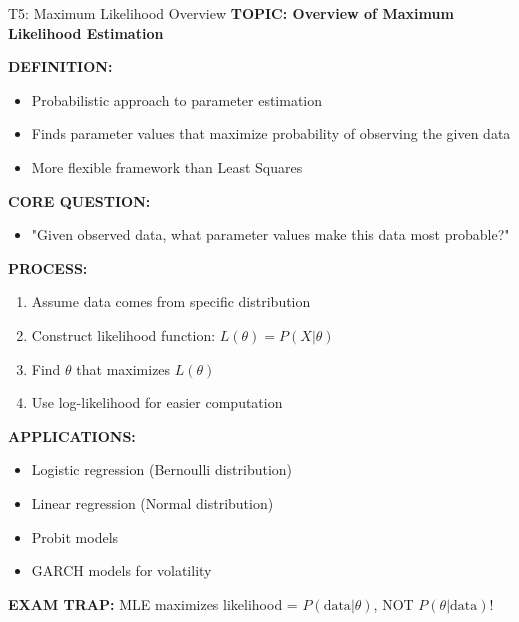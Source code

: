 \documentclass[8pt]{beamer}
\begin{document}
	\begin{frame}{T5: Maximum Likelihood Overview}
		\fontsize{6.5}{7.5}\selectfont
		\textbf{TOPIC: Overview of Maximum Likelihood Estimation}
		
		\vspace{0.1cm}
		\textbf{DEFINITION:}
		\begin{itemize}
			\item Probabilistic approach to parameter estimation
			\item Finds parameter values that maximize probability of observing the given data
			\item More flexible framework than Least Squares
		\end{itemize}
		
		\vspace{0.1cm}
		\textbf{CORE QUESTION:}
		\begin{itemize}
			\item "Given observed data, what parameter values make this data most probable?"
		\end{itemize}
		
		\vspace{0.1cm}
		\textbf{PROCESS:}
		\begin{enumerate}
			\item Assume data comes from specific distribution
			\item Construct likelihood function: $L(\theta) = P(X|\theta)$
			\item Find $\theta$ that maximizes $L(\theta)$
			\item Use log-likelihood for easier computation
		\end{enumerate}
		
		\vspace{0.1cm}
		\textbf{APPLICATIONS:}
		\begin{itemize}
			\item Logistic regression (Bernoulli distribution)
			\item Linear regression (Normal distribution)
			\item Probit models
			\item GARCH models for volatility
		\end{itemize}
		
		\textcolor{myred}{\textbf{EXAM TRAP:}} MLE maximizes \textcolor{myblue}{likelihood} = $P(\text{data}|\theta)$, NOT $P(\theta|\text{data})$!
	\end{frame}
	
	
\end{document}
